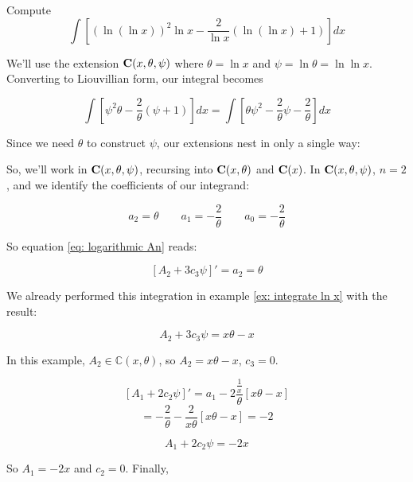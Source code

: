 \endexample

\vfill\eject

\example
\label{double-log integral}
Compute
$$\int \left[ (\ln(\ln x))^2 \ln x - \frac{2}{\ln x}(\ln(\ln x) +1) \right] dx$$

We'll use the extension ${\bf C}(x,\theta,\psi)$
where $\theta = \ln x$ and $\psi = \ln \theta = \ln \ln x$.
Converting to Liouvillian form, our integral becomes

$$\int \left[ \psi^2 \theta - \frac{2}{\theta}(\psi+1) \right] dx
= \int \left[ \theta \psi^2 - \frac{2}{\theta}\psi - \frac{2}{\theta} \right] dx$$

Since we need $\theta$ to construct $\psi$, our extensions nest
in only a single way:

\begin{center}
\end{center}

So, we'll work in ${\bf C}(x,\theta,\psi)$, recursing into
${\bf C}(x,\theta)$ and ${\bf C}(x)$.  In ${\bf C}(x,\theta,\psi)$,
$n=2$, and we identify the coefficients of our integrand:

$$a_2 = \theta \qquad a_1 = - \frac{2}{\theta} \qquad a_0 = - \frac{2}{\theta}$$

So equation \eqref{eq: logarithmic An} reads:

$$\left[ A_2 + 3 c_3 \psi \right]' = a_2 = \theta$$

We already performed this integration in example \ref{ex: integrate ln x}
with the result:

$$A_2 + 3 c_3 \psi = x\theta - x$$

In this example, $A_2 \in {\mathbb C}(x,\theta)$, so $A_2 = x\theta -x$, $c_3=0$.

$$\left[ A_1 + 2 c_2 \psi \right]' = a_1 - 2 \frac{\frac{1}{x}}{\theta}[x\theta - x]$$
$$= -\frac{2}{\theta} - \frac{2}{x \theta}[x\theta - x] = -2$$

$$A_1 + 2 c_2 \psi = -2x$$

So $A_1 = -2x$ and $c_2 = 0$.  Finally,

